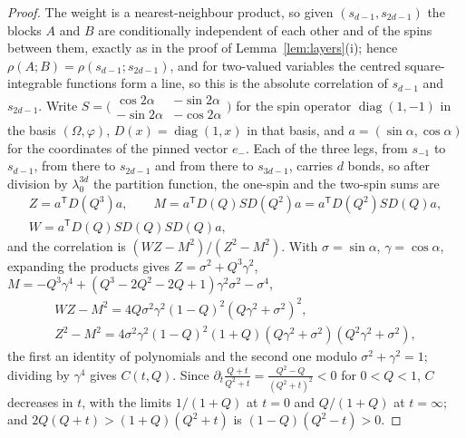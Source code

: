 \begin{proof}
The weight is a nearest-neighbour product, so given $(s_{d-1},s_{2d-1})$ the
blocks $A$ and $B$ are conditionally independent of each other and of the
spins between them, exactly as in the proof of Lemma~\ref{lem:layers}(i);
hence $\rho(A;B)=\rho(s_{d-1};s_{2d-1})$, and for two-valued variables the
centred square-integrable functions form a line, so this is the absolute
correlation of $s_{d-1}$ and $s_{2d-1}$. Write $S=\bigl(\begin{smallmatrix}
\cos2\alpha&-\sin2\alpha\\-\sin2\alpha&-\cos2\alpha\end{smallmatrix}\bigr)$ for
the spin operator $\operatorname{diag}(1,-1)$ in the basis $(\Omega,
\varphi)$, $D(x)=\operatorname{diag}(1,x)$ in that basis, and $a=(\sin
\alpha,\cos\alpha)$ for the coordinates of the pinned vector $e_-$. Each of
the three legs, from $s_{-1}$ to $s_{d-1}$, from there to $s_{2d-1}$ and from
there to $s_{3d-1}$, carries $d$ bonds, so after division by
$\lambda_0^{3d}$ the partition function, the one-spin and the two-spin sums
are
\begin{gather*}
Z=a^{\mathsf T}D(Q^3)a,\qquad M=a^{\mathsf T}D(Q)SD(Q^2)a=a^{\mathsf T}D
(Q^2)SD(Q)a,\\ W=a^{\mathsf T}D(Q)SD(Q)SD(Q)a,
\end{gather*}
and the correlation is $(WZ-M^2)/(Z^2-M^2)$. With $\sigma=\sin\alpha$,
$\gamma=\cos\alpha$, expanding the products gives $Z=\sigma^2+Q^3\gamma^2$,
$M=-Q^3\gamma^4+(Q^3-2Q^2-2Q+1)\gamma^2\sigma^2-\sigma^4$,
\begin{gather*}
WZ-M^2=4Q\sigma^2\gamma^2(1-Q)^2(Q\gamma^2+\sigma^2)^2,\\
Z^2-M^2=4\sigma^2\gamma^2(1-Q)^2(1+Q)(Q\gamma^2+\sigma^2)(Q^2\gamma^2+
\sigma^2),
\end{gather*}
the first an identity of polynomials and the second one modulo
$\sigma^2+\gamma^2=1$; dividing by $\gamma^4$ gives $C(t,Q)$. Since
$\partial_t\frac{Q+t}{Q^2+t}=\frac{Q^2-Q}{(Q^2+t)^2}<0$ for $0<Q<1$, $C$
decreases in $t$, with the limits $1/(1+Q)$ at $t=0$ and $Q/(1+Q)$ at
$t=\infty$; and $2Q(Q+t)>(1+Q)(Q^2+t)$ is $(1-Q)(Q^2-t)>0$.
\end{proof}


